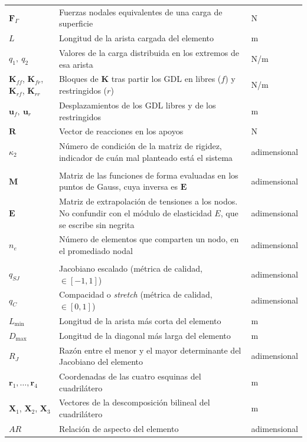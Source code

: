 \begin{longtable}{@{}>{\raggedright\arraybackslash}p{3.0cm}p{7.8cm}p{3.0cm}@{}}
$\bm{F}_\Gamma$ & Fuerzas nodales equivalentes de una carga de superficie & N \\
$L$ & Longitud de la arista cargada del elemento & m \\
$q_1,\ q_2$ & Valores de la carga distribuida en los extremos de esa arista & N/m \\
$\bm{K}_{ff}$, $\bm{K}_{fr}$, $\bm{K}_{rf}$, $\bm{K}_{rr}$ & Bloques de $\bm{K}$ tras partir los GDL en libres ($f$) y restringidos ($r$) & N/m \\
$\bm{u}_f,\ \bm{u}_r$ & Desplazamientos de los GDL libres y de los restringidos & m \\
$\bm{R}$ & Vector de reacciones en los apoyos & N \\
$\kappa_2$ & Número de condición de la matriz de rigidez, indicador de cuán mal planteado está el sistema & adimensional \\
\addlinespace
\multicolumn{3}{@{}l}{\textit{Recuperación de tensiones}} \\
\addlinespace
$\bm{M}$ & Matriz de las funciones de forma evaluadas en los puntos de Gauss, cuya inversa es $\bm{E}$ & adimensional \\
$\bm{E}$ & Matriz de extrapolación de tensiones a los nodos. No confundir con el módulo de elasticidad $E$, que se escribe sin negrita & adimensional \\
$n_e$ & Número de elementos que comparten un nodo, en el promediado nodal & adimensional \\
\addlinespace
\multicolumn{3}{@{}l}{\textit{Calidad geométrica de la malla}} \\
\addlinespace
$q_{SJ}$ & Jacobiano escalado (métrica de calidad, $\in[-1,1]$) & adimensional \\
$q_C$ & Compacidad o \emph{stretch} (métrica de calidad, $\in[0,1]$) & adimensional \\
$L_{\min}$ & Longitud de la arista más corta del elemento & m \\
$D_{\max}$ & Longitud de la diagonal más larga del elemento & m \\
$R_J$ & Razón entre el menor y el mayor determinante del Jacobiano del elemento & adimensional \\
$\bm{r}_1,\dots,\bm{r}_4$ & Coordenadas de las cuatro esquinas del cuadrilátero & m \\
$\bm{X}_1$, $\bm{X}_2$, $\bm{X}_3$ & Vectores de la descomposición bilineal del cuadrilátero & m \\
$AR$ & Relación de aspecto del elemento & adimensional \\

\end{longtable}
